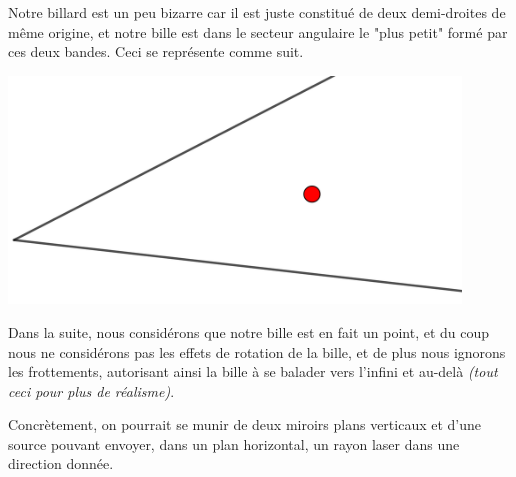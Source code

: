 Notre billard est un peu bizarre car il est juste constitué de deux demi-droites de même origine, et notre bille est dans le secteur angulaire le "plus petit" formé par ces deux bandes. Ceci se représente comme suit.

\medskip

\begin{center}
	\includegraphics[width=12cm]{content/empty.png}
\end{center}

Dans la suite, nous considérons que notre bille est en fait un point, et du coup nous ne considérons pas les effets de rotation de la bille, et de plus nous ignorons les frottements, autorisant ainsi la bille à se balader vers l'infini et au-delà \emph{(tout ceci pour plus de réalisme)}.

\medskip

Concrètement, on pourrait se munir de deux miroirs plans verticaux et d'une source pouvant envoyer, dans un plan horizontal, un rayon laser dans une direction donnée.